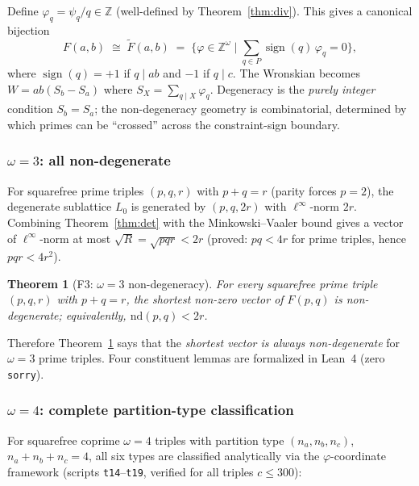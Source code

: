 \documentclass[12pt]{article}
\newtheorem{theorem}{Theorem}
\theoremstyle{definition}
\begin{document}
Define $\varphi_q = \psi_q/q \in \mathbb{Z}$ (well-defined by Theorem~\ref{thm:div}).
This gives a canonical bijection
\[
  F(a,b) \;\cong\; \widetilde{F}(a,b)
  \;=\; \bigl\{\varphi \in \mathbb{Z}^\omega \;\big|\; \textstyle\sum_{q \in P}
  \operatorname{sign}(q)\,\varphi_q = 0\bigr\},
\]
where $\operatorname{sign}(q) = +1$ if $q \mid ab$ and $-1$ if $q \mid c$.
The Wronskian becomes $W = ab(S_b - S_a)$ where $S_X = \sum_{q \mid X} \varphi_q$.
Degeneracy is the \emph{purely integer} condition $S_b = S_a$; the non-degeneracy geometry
is combinatorial, determined by which primes can be ``crossed'' across the constraint-sign boundary.

\subsubsection*{$\omega = 3$: all non-degenerate}

For squarefree prime triples $(p,q,r)$ with $p+q=r$ (parity forces $p=2$),
the degenerate sublattice $L_0$ is generated by $(p,q,2r)$ with $\ell^\infty$-norm $2r$.
Combining Theorem~\ref{thm:det} with the Minkowski--Vaaler bound gives a vector of
$\ell^\infty$-norm at most $\sqrt{R} = \sqrt{pqr} < 2r$
(proved: $pq < 4r$ for prime triples, hence $pqr < 4r^2$).
\begin{theorem}[F3: $\omega{=}3$ non-degeneracy]\label{thm:f3}
For every squarefree prime triple $(p,q,r)$ with $p+q=r$, the shortest non-zero
vector of $F(p,q)$ is non-degenerate; equivalently, $\mathrm{nd}(p,q) < 2r$.
\end{theorem}
Therefore Theorem~\ref{thm:f3} says that the \emph{shortest vector is always
non-degenerate} for $\omega=3$ prime triples.
Four constituent lemmas are formalized in Lean~4 (zero \texttt{sorry}).

\subsubsection*{$\omega = 4$: complete partition-type classification}

For squarefree coprime $\omega=4$ triples with partition type $(n_a, n_b, n_c)$,
$n_a + n_b + n_c = 4$, all six types are classified analytically via the $\varphi$-coordinate
framework (scripts \texttt{t14}--\texttt{t19}, verified for all triples $c \le 300$):
\end{document}
